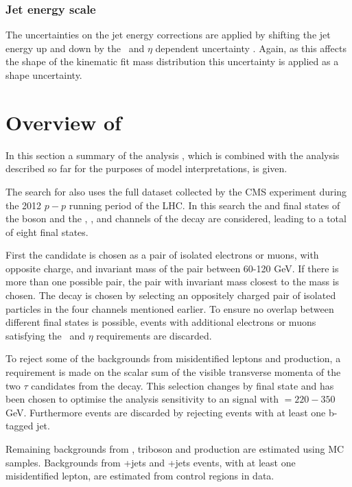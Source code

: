 \subsubsection*{Jet energy scale}
The uncertainties on the jet energy corrections are applied by shifting the jet energy up and down by the \pT~and $\eta$ dependent uncertainty \cite{cms-jec-2011}. Again, as this affects the shape of the kinematic fit mass distribution this uncertainty is applied as a shape uncertainty.
\section{\texorpdfstring{Overview of \AtoZhtolltautau}{Overview of A->Zh->lltautau}}
\label{sec:hhh_azh}
In this section a summary of the \AtoZhtolltautau analysis \cite{CMS-HIG-14-034}, which is combined with the 
analysis described so far for the purposes of model interpretations, is given.

The search for \AtoZhtolltautau also uses the full dataset collected by the CMS experiment during
the 2012 $p-p$ running period of the LHC. In this search the \mumu and \ee final states of the \PZ boson
and the \emu, \etau, \mutau and \tautau channels of the \htotautau decay are considered, leading to a total of
eight final states. 

First the \PZ candidate is chosen as a pair of isolated electrons or muons, with opposite charge, and 
invariant mass of the pair between 60-120 GeV. If there is more than one possible pair, the 
pair with invariant mass closest to the \PZ mass is chosen. The \htotautau decay is chosen by selecting
an oppositely charged pair of isolated particles in the four channels mentioned earlier. To ensure no overlap
between different final states is possible, events with additional electrons or muons satisfying the
\pT~and $\eta$ requirements are discarded.

To reject some of the backgrounds from misidentified leptons and \ZZ production, a requirement is made
on the scalar sum of the visible transverse momenta of the two $\tau$ candidates from the \htotautau decay.
This selection changes by final state and has been chosen to optimise the analysis sensitivity to an 
\AtoZh signal with \mA $= 220 - 350 $ GeV. Furthermore \ttbar events are discarded by rejecting
events with at least one b-tagged jet. 

Remaining backgrounds from \ZZ, triboson and \ttbar\PZ production are estimated using
\ac{MC} samples. Backgrounds from \PZ+jets %
and \WZ+jets %
events, with at least one misidentified lepton, are estimated from control regions in data.


